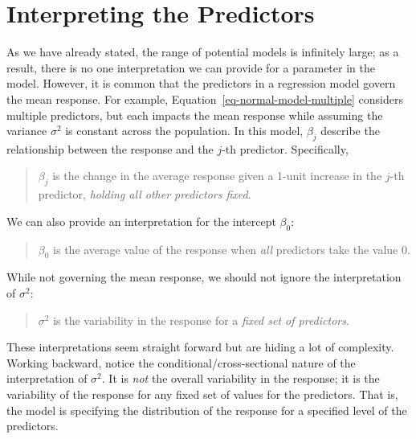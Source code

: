 \documentclass[
  letterpaper,
  DIV=11,
  numbers=noendperiod]{scrreprt}
\theoremstyle{definition}
\theoremstyle{plain}
\theoremstyle{definition}
\theoremstyle{remark}
\begin{document}
\hypertarget{interpreting-the-predictors}{%
\section{Interpreting the
Predictors}\label{interpreting-the-predictors}}

As we have already stated, the range of potential models is infinitely
large; as a result, there is no one interpretation we can provide for a
parameter in the model. However, it is common that the predictors in a
regression model govern the mean response. For example,
Equation~\ref{eq-normal-model-multiple} considers multiple predictors,
but each impacts the mean response while assuming the variance
\(\sigma^2\) is constant across the population. In this model,
\(\beta_j\) describe the relationship between the response and the
\(j\)-th predictor. Specifically,

\begin{quote}
\(\beta_j\) is the change in the average response given a 1-unit
increase in the \(j\)-th predictor, \emph{holding all other predictors
fixed}.
\end{quote}

We can also provide an interpretation for the intercept \(\beta_0\):

\begin{quote}
\(\beta_0\) is the average value of the response when \emph{all}
predictors take the value 0.
\end{quote}

While not governing the mean response, we should not ignore the
interpretation of \(\sigma^2\):

\begin{quote}
\(\sigma^2\) is the variability in the response for a \emph{fixed set of
predictors}.
\end{quote}

These interpretations seem straight forward but are hiding a lot of
complexity. Working backward, notice the conditional/cross-sectional
nature of the interpretation of \(\sigma^2\). It is \emph{not} the
overall variability in the response; it is the variability of the
response for any fixed set of values for the predictors. That is, the
model is specifying the distribution of the response for a specified
level of the predictors.
\end{document}
